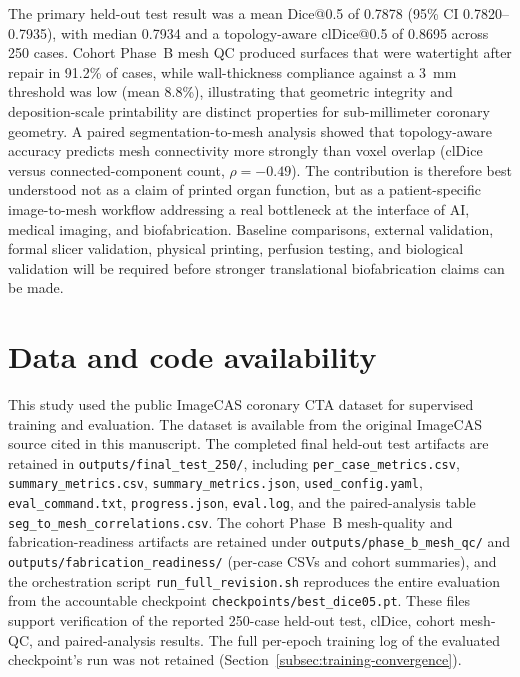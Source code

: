 \documentclass[anonymous]{iopjournal}
\begin{document}
The primary held-out test result was a mean Dice@0.5 of 0.7878 (95\% CI 0.7820--0.7935), with median 0.7934 and a topology-aware clDice@0.5 of 0.8695 across 250 cases. Cohort Phase~B mesh QC produced surfaces that were watertight after repair in 91.2\% of cases, while wall-thickness compliance against a \SI{3}{mm} threshold was low (mean 8.8\%), illustrating that geometric integrity and deposition-scale printability are distinct properties for sub-millimeter coronary geometry. A paired segmentation-to-mesh analysis showed that topology-aware accuracy predicts mesh connectivity more strongly than voxel overlap (clDice versus connected-component count, $\rho=-0.49$). The contribution is therefore best understood not as a claim of printed organ function, but as a patient-specific image-to-mesh workflow addressing a real bottleneck at the interface of AI, medical imaging, and biofabrication. Baseline comparisons, external validation, formal slicer validation, physical printing, perfusion testing, and biological validation will be required before stronger translational biofabrication claims can be made.

\section*{Data and code availability}

This study used the public ImageCAS coronary CTA dataset for supervised training and evaluation. The dataset is available from the original ImageCAS source cited in this manuscript. The completed final held-out test artifacts are retained in \texttt{outputs/final\_test\_250/}, including \texttt{per\_case\_metrics.csv}, \texttt{summary\_metrics.csv}, \texttt{summary\_metrics.json}, \texttt{used\_config.yaml}, \texttt{eval\_command.txt}, \texttt{progress.json}, \texttt{eval.log}, and the paired-analysis table \texttt{seg\_to\_mesh\_correlations.csv}. The cohort Phase~B mesh-quality and fabrication-readiness artifacts are retained under \texttt{outputs/phase\_b\_mesh\_qc/} and \texttt{outputs/fabrication\_readiness/} (per-case CSVs and cohort summaries), and the orchestration script \texttt{run\_full\_revision.sh} reproduces the entire evaluation from the accountable checkpoint \texttt{checkpoints/best\_dice05.pt}. These files support verification of the reported 250-case held-out test, clDice, cohort mesh-QC, and paired-analysis results. The full per-epoch training log of the evaluated checkpoint's run was not retained (Section~\ref{subsec:training-convergence}).
\end{document}
